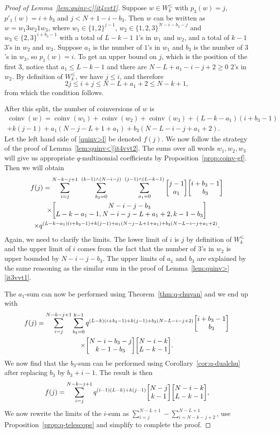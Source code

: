 \documentclass[ALCO,Unicode]{cedram}
\DeclareMathOperator{\coinv}{coinv}
\newcommand{\qbinom}[2]{\bgroup\renewcommand*{\arraystretch}{1}\begin{bmatrix} #1 \\ #2\end{bmatrix} \egroup}
\begin{document}
\begin{proof}[Proof of Lemma~\ref{lem:quinv<}\ref{it4vvt1}]
Suppose $w \in  W_k^\leq$ with $p_3(w) = j$, $p'_1(w) = i+b_3$ and $j < N+1 - i-b_3$. Then
$w$ can be written as $w = w_1 3 w_2 1 w_3$, where $w_1 \in \{1,2\}^{j-1}$, $w_2 \in \{1,2,3\}^{N-i-b_3-j}$ 
and $w_3 \in \{2,3\}^{i+b_3-1}$ with a total of $L-k-1$ $1$'s in $w_1$ and $w_2$, and a total of
$k-1$ $3$'s in $w_2$ and $w_3$. 
Suppose $a_1$ is the number of $1$'s in $w_1$ and $b_3$ is the number of $3$'s in $w_3$, so $p_1(w) = i$. To get an upper bound on $j$, which is the position of the first $3$, notice that $a_1 \leq L-k-1$ and
there are $N-L+a_1-i-j+2\geq 0$ $2$'s in $w_2$. By definition of $W_k^{\leq}$, we have $j \leq i$, and therefore
\[
2j \leq i+j \leq N - L + a_1 + 2 \leq N - k+1,
\]
from which the condition follows.

After this split, the number of coinversions of $w$ is
\begin{multline*}
\coinv(w) = \coinv(w_1) + \coinv(w_2) +\coinv(w_3) + (L-k-a_1)(i+b_3-1)  \\
+ k(j-1) + a_1(N-j-L+1+a_1) + b_3(N-L-i-j+a_1+2).
\end{multline*}
Let the left hand side of \eqref{quinv>l} be denoted $f(j)$.
We now follow the strategy of the proof of Lemma~\ref{lem:quinv<}\ref{it4vvt2}. 
The sums over all
words $w_1, w_2, w_3$ will give us appropriate $q$-multinomial coefficients by 
Proposition~\ref{prop:coinv-gf}. Then we will obtain
\begin{multline*}
f(j) = \sum_{i = j}^{N-k-j+1}\  \sum_{b_3 = 0}^{(k-1) \wedge (N-i-j)}\ \sum_{a_1 = 0}^{(j-1) \wedge (L-k-1)} 
\qbinom {j-1}{a_1} \qbinom{i+b_3-1}{b_3} \\
\times\qbinom {N-i-j-b_3}{L-k-a_1-1, N-i-j-L+a_1+2,k-1-b_3} \\
\times q^{(L-k-a_1)(i+b_3-1) + k(j-1) + a_1(N-j-L+1+a_1) + b_3(N-L-i-j+a_1+2)}.
\end{multline*}
Again, we need to clarify the limits. The lower limit of $i$ is $j$ by definition of $W_k^\leq$
and the upper limit of $i$ comes from the fact that the number of $3$'s in $w_2$ is upper bounded
by $N-i-j-b_3$. The upper limits of $a_1$ and $b_3$ are explained by the same reasoning
as the similar sum in the proof of Lemma~\ref{lem:quinv>}\ref{it3vvt1}.

The $a_1$-sum can now be performed using Theorem~\ref{thm:q-chuvan} and we end up with
\begin{multline*}
f(j) =  \sum_{i = j}^{N-k-j+1}  \sum_{b_3 = 0}^{k-1}  q^{(L-k)(i+b_3-1) + k(j-1) + b_3(N-L-i-j+2)} \qbinom{i+b_3-1}{b_3} \\
\times \qbinom {N-i-b_3-j}{k-1-b_3}  \qbinom {N-i-k}{L-k-1} .
\end{multline*}
We now find that the $b_3$-sum can be performed using Corollary~\ref{cor:q-dualchu} after replacing $b_3$
by $b_3+i-1$.  
The result is then
\[
f(j) = \sum_{i = j}^{N-k-j+1}  q^{(i-1)(L-k) + k(j-1)}  \qbinom {N-j}{k-1}\qbinom {N-i-k}{L-k-1} ,
\]
We now rewrite the limits of the $i$-sum as $\sum_{i = j}^{N-L+1} - \sum_{i = N-k-j+2}^{N-L+1}$,
 use Proposition~\ref{prop:q-telescope} and simplify to complete the proof.
\end{proof}
\end{document}
